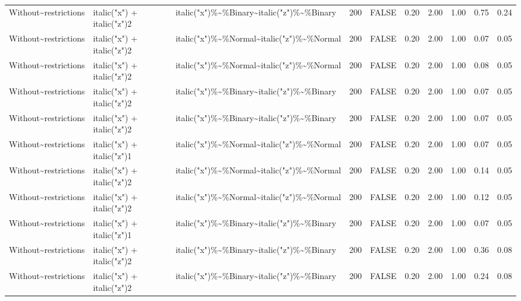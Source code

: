 \begin{table}[ht]
\begin{tabular}{lllrlrrrrr}
  Without\~{}restrictions & italic("x") + italic("z")2 & italic("x")\%\~{}\%Binary\~{}italic("z")\%\~{}\%Binary & 200 & FALSE & 0.20 & 2.00 & 1.00 & 0.75 & 0.24 \\ 
  Without\~{}restrictions & italic("x") + italic("z")2 & italic("x")\%\~{}\%Normal\~{}italic("z")\%\~{}\%Normal & 200 & FALSE & 0.20 & 2.00 & 1.00 & 0.07 & 0.05 \\ 
  Without\~{}restrictions & italic("x") + italic("z")2 & italic("x")\%\~{}\%Normal\~{}italic("z")\%\~{}\%Normal & 200 & FALSE & 0.20 & 2.00 & 1.00 & 0.08 & 0.05 \\ 
  Without\~{}restrictions & italic("x") + italic("z")2 & italic("x")\%\~{}\%Binary\~{}italic("z")\%\~{}\%Binary & 200 & FALSE & 0.20 & 2.00 & 1.00 & 0.07 & 0.05 \\ 
  Without\~{}restrictions & italic("x") + italic("z")2 & italic("x")\%\~{}\%Binary\~{}italic("z")\%\~{}\%Binary & 200 & FALSE & 0.20 & 2.00 & 1.00 & 0.07 & 0.05 \\ 
  Without\~{}restrictions & italic("x") + italic("z")1 & italic("x")\%\~{}\%Normal\~{}italic("z")\%\~{}\%Normal & 200 & FALSE & 0.20 & 2.00 & 1.00 & 0.07 & 0.05 \\ 
  Without\~{}restrictions & italic("x") + italic("z")2 & italic("x")\%\~{}\%Normal\~{}italic("z")\%\~{}\%Normal & 200 & FALSE & 0.20 & 2.00 & 1.00 & 0.14 & 0.05 \\ 
  Without\~{}restrictions & italic("x") + italic("z")2 & italic("x")\%\~{}\%Normal\~{}italic("z")\%\~{}\%Normal & 200 & FALSE & 0.20 & 2.00 & 1.00 & 0.12 & 0.05 \\ 
  Without\~{}restrictions & italic("x") + italic("z")1 & italic("x")\%\~{}\%Binary\~{}italic("z")\%\~{}\%Binary & 200 & FALSE & 0.20 & 2.00 & 1.00 & 0.07 & 0.05 \\ 
  Without\~{}restrictions & italic("x") + italic("z")2 & italic("x")\%\~{}\%Binary\~{}italic("z")\%\~{}\%Binary & 200 & FALSE & 0.20 & 2.00 & 1.00 & 0.36 & 0.08 \\ 
  Without\~{}restrictions & italic("x") + italic("z")2 & italic("x")\%\~{}\%Binary\~{}italic("z")\%\~{}\%Binary & 200 & FALSE & 0.20 & 2.00 & 1.00 & 0.24 & 0.08 \\ 
   \hline
\end{tabular}
\end{table}
